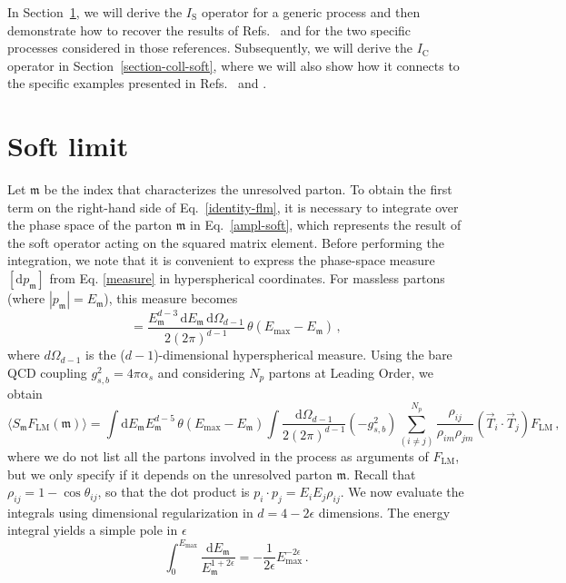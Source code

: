 \documentclass[a4paper, 12pt]{book}
\newcommand{\um}{\mathfrak{m}}
\begin{document}
In Section~\ref{section-soft-limit}, we will derive the $I_\mathrm{S}$ operator for a generic process and then demonstrate how to recover the results of Refs.~\cite{Caola:1907} and \cite{Asteriadis:1910} for the two specific processes considered in those references. Subsequently, we will derive the $I_\mathrm{C}$ operator in Section~\ref{section-coll-soft}, where we will also show how it connects to the specific examples presented in Refs.~\cite{Caola:1902} and \cite{Caola:1907}.
  
\section{Soft limit}
\label{section-soft-limit}
Let $\um$ be the index that characterizes the unresolved parton. To obtain the first term on the right-hand side of Eq.~\ref{identity-flm}, it is necessary to integrate over the phase space of the parton $\um$ in Eq.~\ref{ampl-soft}, which represents the result of the soft operator acting on the squared matrix element. Before performing the integration, we note that it is convenient to express the phase-space measure $[\mathrm{d}p_\um]$ from Eq. \ref{measure} in hyperspherical coordinates. For massless partons (where $|p_\um|=E_\um$), this measure becomes
\begin{equation}
  [\mathrm{d}p_\um] = \frac{E_\um^{d-3} \,\mathrm{d}E_\um  \, \mathrm{d}\Omega_{d-1}}{2 (2 \pi)^{d-1}} \, \theta(E_{\mathrm{max}}-E_\um) \, ,
  \label{measure-ps}
\end{equation}
where ${d}\Omega_{d-1}$ is the ($d-1$)-dimensional hyperspherical measure. Using the bare QCD coupling $g_{s,b}^2 = 4\pi\alpha_s$ and considering $N_p$ partons at Leading Order, we obtain
\begin{equation}
  \langle S_\um F_{\mathrm{LM}} (\um) \rangle = \int \mathrm{d}E_\um E_\um^{d-5} \, \theta(E_{\mathrm{max}}-E_\um)  \int \frac{\mathrm{d}\Omega_{d-1}}{2 (2 \pi)^{d-1}} (-g_{s,b}^2) \sum_{(i \neq j)}^{N_p} \frac{\rho_{ij}}{\rho_{im}\rho_{jm}} (\vec{T}_i \cdot \vec{T}_j) F_{\mathrm{LM}} \, ,
\end{equation}
where we do not list all the partons involved in the process as arguments of $F_{\mathrm{LM}}$, but we only 
specify if it depends on the unresolved parton $\um$. Recall that $\rho_{ij} = 1 - \cos\theta_{ij}$, so that the dot product is $p_i \cdot p_j = E_i E_j \rho_{ij}$. We now evaluate the integrals using dimensional regularization in $d=4-2\epsilon$ dimensions. The energy integral yields a simple pole in $\epsilon$
\begin{equation}
  \int_0^{E_{\mathrm{max}}} \frac{\mathrm{d}E_\um}{ E_\um^{1+2\epsilon}} = - \frac{1}{2 \epsilon} E_{\mathrm{max}}^{-2 \epsilon} \, .
\end{equation}
\end{document}
